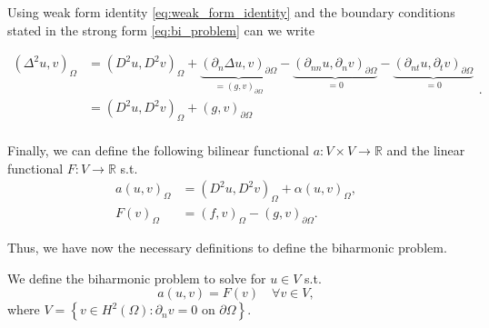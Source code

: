Using weak form identity \eqref{eq:weak_form_identity} and the boundary conditions stated in the strong form \eqref{eq:bi_problem} can we write

\begin{equation}
\begin{split}
\left( \Delta ^2 u, v \right) _{ \Omega } & = \left( D^2u, D^2v \right) _{\Omega} +   \underbrace{\left( \partial _{n} \Delta u, v  \right) _{\partial \Omega }}_{ = \left( g,v \right) _{\partial \Omega }}   - \underbrace{(\partial _{nn} u, \partial
    _{n} v )_{\partial \Omega }}_{ = 0}  - \underbrace{\left( \partial _{nt} u, \partial _{t}v \right) _{\partial \Omega }}_{ = 0} \\
    &= \left( D^2u, D^2v \right) _{\Omega } + \left( g,v \right) _{\partial \Omega }  \\
\end{split}
.\end{equation}

Finally, we can define the following bilinear functional $a:V\times V \to  \mathbb{R} $ and the linear functional $F: V \to \mathbb{R} $ s.t.
\begin{equation}
\label{eq:weak_formulation}
\begin{split}
a\left( u,v \right)_{\Omega } & =    \left( D ^2 u , D ^2 v\right)_{\Omega }  +
\alpha \left( u, v \right)_{\Omega }   , \\
F\left( v \right)_{\Omega } & = \left( f,v \right)_{\Omega } - \left(g,v \right)_{\partial \Omega }.
\end{split}
\end{equation}

Thus, we have now the necessary definitions to define the biharmonic problem.

We define the biharmonic problem to solve for $u \in V  $ s.t.
\begin{equation}
    \label{eq:bi_weak1}
a\left( u,v \right) = F(v)\quad \forall v \in
V,
\end{equation}
where $ V = \left\{ v \in H^2\left( \Omega  \right) : \partial _{n} v = 0  \text{ on }
\partial \Omega  \right\}$.


